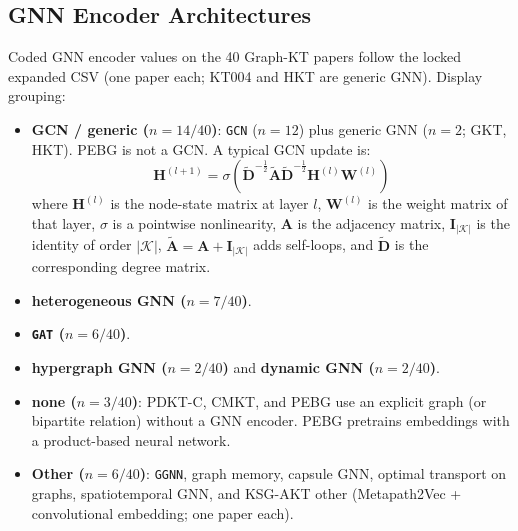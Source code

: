 \documentclass[lettersize,journal]{IEEEtran}
\begin{document}
\subsection{GNN Encoder Architectures}
Coded GNN encoder values on the 40 Graph-KT papers follow the locked expanded CSV (one paper each; KT004 and HKT are generic GNN). Display grouping:
\begin{itemize}
    \item \textbf{GCN / generic ($n=14/40$)}: \texttt{GCN} ($n=12$) plus generic GNN ($n=2$; GKT, HKT). PEBG is not a GCN. A typical GCN update is:
    \begin{equation}
    \mathbf{H}^{(l+1)} = \sigma\left(\tilde{\mathbf{D}}^{-\frac{1}{2}} \tilde{\mathbf{A}} \tilde{\mathbf{D}}^{-\frac{1}{2}} \mathbf{H}^{(l)} \mathbf{W}^{(l)}\right)
    \end{equation}
    where $\mathbf{H}^{(l)}$ is the node-state matrix at layer $l$, $\mathbf{W}^{(l)}$ is the weight matrix of that layer, $\sigma$ is a pointwise nonlinearity, $\mathbf{A}$ is the adjacency matrix, $\mathbf{I}_{|\mathcal{K}|}$ is the identity of order $|\mathcal{K}|$, $\tilde{\mathbf{A}} = \mathbf{A} + \mathbf{I}_{|\mathcal{K}|}$ adds self-loops, and $\tilde{\mathbf{D}}$ is the corresponding degree matrix.
    \item \textbf{heterogeneous GNN ($n=7/40$)}.
    \item \textbf{\texttt{GAT} ($n=6/40$)}.
    \item \textbf{hypergraph GNN ($n=2/40$)} and \textbf{dynamic GNN ($n=2/40$)}.
    \item \textbf{none ($n=3/40$)}: PDKT-C, CMKT, and PEBG use an explicit graph (or bipartite relation) without a GNN encoder. PEBG pretrains embeddings with a product-based neural network.
    \item \textbf{Other ($n=6/40$)}: \texttt{GGNN}, graph memory, capsule GNN, optimal transport on graphs, spatiotemporal GNN, and KSG-AKT other (Metapath2Vec + convolutional embedding; one paper each).
\end{itemize}
\end{document}
